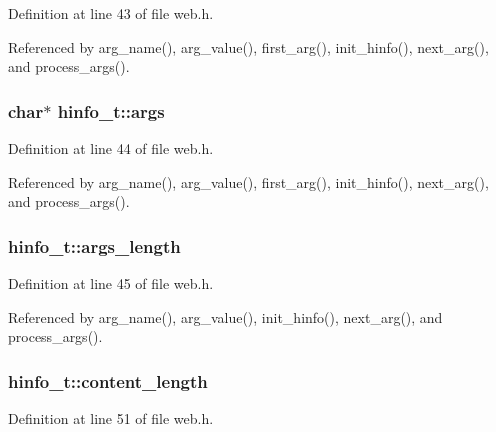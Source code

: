 Definition at line 43 of file web.\-h.



Referenced by arg\-\_\-name(), arg\-\_\-value(), first\-\_\-arg(), init\-\_\-hinfo(), next\-\_\-arg(), and process\-\_\-args().

\hypertarget{structhinfo__t_a62bf198b939a9d932bcac763ebc51443}{
\subsubsection[{args}]{\setlength{\rightskip}{0pt plus 5cm}char$\ast$ hinfo\-\_\-t\-::args}}\label{structhinfo__t_a62bf198b939a9d932bcac763ebc51443}


Definition at line 44 of file web.\-h.



Referenced by arg\-\_\-name(), arg\-\_\-value(), first\-\_\-arg(), init\-\_\-hinfo(), next\-\_\-arg(), and process\-\_\-args().

\hypertarget{structhinfo__t_a003130c9489dfe54a76df23a85fae62f}{
\subsubsection[{args\-\_\-length}]{ hinfo\-\_\-t\-::args\-\_\-length}}\label{structhinfo__t_a003130c9489dfe54a76df23a85fae62f}


Definition at line 45 of file web.\-h.



Referenced by arg\-\_\-name(), arg\-\_\-value(), init\-\_\-hinfo(), next\-\_\-arg(), and process\-\_\-args().

\hypertarget{structhinfo__t_a6cf5714c0fe8e8e7f7819194274f9052}{
\subsubsection[{content\-\_\-length}]{ hinfo\-\_\-t\-::content\-\_\-length}}\label{structhinfo__t_a6cf5714c0fe8e8e7f7819194274f9052}


Definition at line 51 of file web.\-h.



